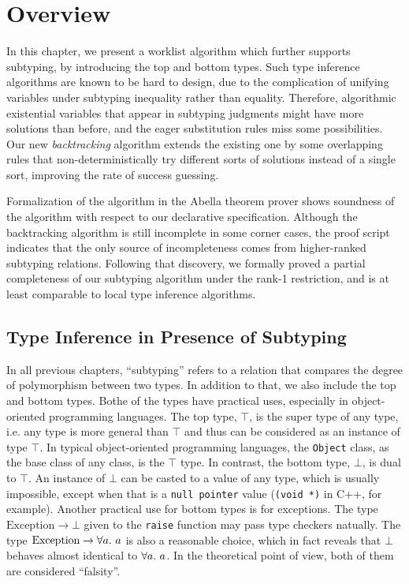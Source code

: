 
\section{Overview}

In this chapter, we present a worklist algorithm
which further supports subtyping,
by introducing the top and bottom types.
Such type inference algorithms are known to be hard to design,
due to the complication of unifying variables under subtyping inequality
rather than equality.
Therefore, algorithmic existential variables that appear in subtyping judgments
might have more solutions than before,
and the eager substitution rules miss some possibilities.
Our new \emph{backtracking} algorithm extends the existing one by some overlapping rules that
non-deterministically try different sorts of solutions instead of a single sort,
improving the rate of success guessing.

Formalization of the algorithm in the Abella theorem prover shows soundness of the algorithm
with respect to our declarative specification.
Although the backtracking algorithm is still incomplete in some corner cases,
the proof script indicates that the only source of incompleteness comes from
higher-ranked subtyping relations.
Following that discovery, we formally proved a partial completeness of our subtyping algorithm
under the rank-1 restriction,
and is at least comparable to local type inference algorithms.

\subsection{Type Inference in Presence of Subtyping}

In all previous chapters, ``subtyping'' refers to a relation that compares
the degree of polymorphism between two types.
In addition to that, we also include the top and bottom types.
Bothe of the types have practical uses, especially in object-oriented programming languages.
The top type, $\top$, is the super type of any type,
i.e. any type is more general than $\top$
and thus can be considered as an instance of type $\top$.
In typical object-oriented programming languages, the \texttt{Object} class,
as the base class of any class, is the $\top$ type.
In contrast, the bottom type, $\bot$, is dual to $\top$.
An instance of $\bot$ can be casted to a value of any type, which is usually impossible,
except when that is a \texttt{null pointer} value (\texttt{(void *)} in C++, for example).
Another practical use for bottom types is for exceptions.
The type $\text{Exception} \to \bot$ given to the \texttt{raise}
function may pass type checkers natually.
The type $\text{Exception} \to \all a$ is also a reasonable choice,
which in fact reveals that $\bot$ behaves almost identical to $\all a$.
In the theoretical point of view, both of them are considered ``falsity''.




